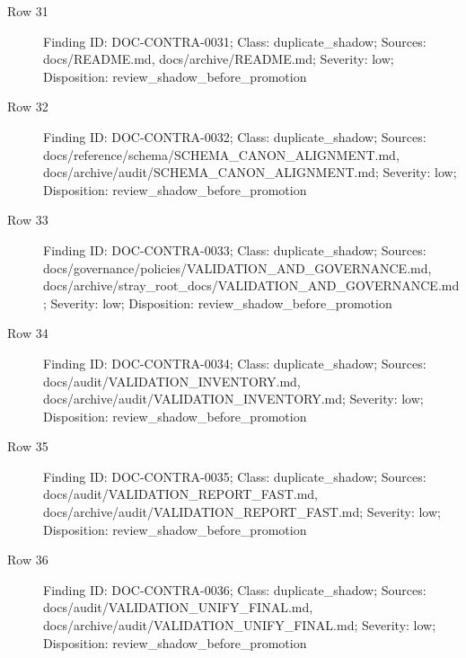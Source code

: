\documentclass[9pt,a4paper]{book}
\begin{document}
\begin{description}
\item[Row 31] Finding ID: DOC-\allowbreak{}CONTRA-\allowbreak{}0031; Class: duplicate\_\allowbreak{}shadow; Sources: docs/\allowbreak{}README.\allowbreak{}md, docs/\allowbreak{}archive/\allowbreak{}README.\allowbreak{}md; Severity: low; Disposition: review\_\allowbreak{}shadow\_\allowbreak{}before\_\allowbreak{}promotion
\item[Row 32] Finding ID: DOC-\allowbreak{}CONTRA-\allowbreak{}0032; Class: duplicate\_\allowbreak{}shadow; Sources: docs/\allowbreak{}reference/\allowbreak{}schema/\allowbreak{}SCHEMA\_\allowbreak{}CANON\_\allowbreak{}ALIGNMENT.\allowbreak{}md, docs/\allowbreak{}archive/\allowbreak{}audit/\allowbreak{}SCHEMA\_\allowbreak{}CANON\_\allowbreak{}ALIGNMENT.\allowbreak{}md; Severity: low; Disposition: review\_\allowbreak{}shadow\_\allowbreak{}before\_\allowbreak{}promotion
\item[Row 33] Finding ID: DOC-\allowbreak{}CONTRA-\allowbreak{}0033; Class: duplicate\_\allowbreak{}shadow; Sources: docs/\allowbreak{}governance/\allowbreak{}policies/\allowbreak{}VALIDATION\_\allowbreak{}AND\_\allowbreak{}GOVERNANCE.\allowbreak{}md, docs/\allowbreak{}archive/\allowbreak{}stray\_\allowbreak{}root\_\allowbreak{}docs/\allowbreak{}VALIDATION\_\allowbreak{}AND\_\allowbreak{}GOVERNANCE.\allowbreak{}md; Severity: low; Disposition: review\_\allowbreak{}shadow\_\allowbreak{}before\_\allowbreak{}promotion
\item[Row 34] Finding ID: DOC-\allowbreak{}CONTRA-\allowbreak{}0034; Class: duplicate\_\allowbreak{}shadow; Sources: docs/\allowbreak{}audit/\allowbreak{}VALIDATION\_\allowbreak{}INVENTORY.\allowbreak{}md, docs/\allowbreak{}archive/\allowbreak{}audit/\allowbreak{}VALIDATION\_\allowbreak{}INVENTORY.\allowbreak{}md; Severity: low; Disposition: review\_\allowbreak{}shadow\_\allowbreak{}before\_\allowbreak{}promotion
\item[Row 35] Finding ID: DOC-\allowbreak{}CONTRA-\allowbreak{}0035; Class: duplicate\_\allowbreak{}shadow; Sources: docs/\allowbreak{}audit/\allowbreak{}VALIDATION\_\allowbreak{}REPORT\_\allowbreak{}FAST.\allowbreak{}md, docs/\allowbreak{}archive/\allowbreak{}audit/\allowbreak{}VALIDATION\_\allowbreak{}REPORT\_\allowbreak{}FAST.\allowbreak{}md; Severity: low; Disposition: review\_\allowbreak{}shadow\_\allowbreak{}before\_\allowbreak{}promotion
\item[Row 36] Finding ID: DOC-\allowbreak{}CONTRA-\allowbreak{}0036; Class: duplicate\_\allowbreak{}shadow; Sources: docs/\allowbreak{}audit/\allowbreak{}VALIDATION\_\allowbreak{}UNIFY\_\allowbreak{}FINAL.\allowbreak{}md, docs/\allowbreak{}archive/\allowbreak{}audit/\allowbreak{}VALIDATION\_\allowbreak{}UNIFY\_\allowbreak{}FINAL.\allowbreak{}md; Severity: low; Disposition: review\_\allowbreak{}shadow\_\allowbreak{}before\_\allowbreak{}promotion

\end{description}
\end{document}
